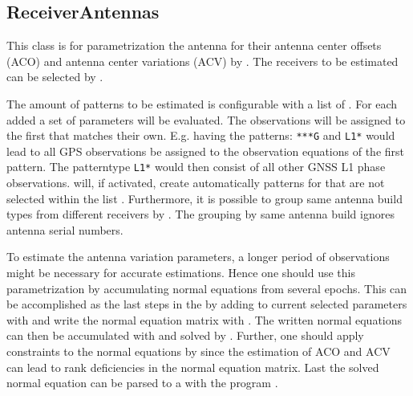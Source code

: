 \subsection{ReceiverAntennas}\label{gnssParametrizationType:receiverAntennas}
This class is for parametrization the antenna for their antenna center offsets (ACO) and
antenna center variations (ACV) by .
The receivers to be estimated can be selected by .

The amount of patterns to be estimated is configurable with a list of .
For each added  a set of parameters will be evaluated. The observations
will be assigned to the first  that matches their own.
E.g. having the patterns: \verb|***G| and \verb|L1*| would lead to all GPS observations be assigned
to the observation equations of the first pattern. The patterntype \verb|L1*| would then consist
of all other GNSS L1 phase observations.  will, if activated, create automatically patterns
for  that are not selected within the list .
Furthermore, it is possible to group same antenna build types from different receivers by .
The grouping by same antenna build ignores antenna serial numbers.

To estimate the antenna variation parameters, a longer period of observations might be necessary
for accurate estimations. Hence one should use this parametrization by
accumulating normal equations from several epochs.
This can be accomplished as the last steps in the 
 by adding 
to current selected parameters with 
and write the normal equation matrix with .
The written normal equations can then be accumulated with  and solved by .
Further, one should apply constraints to the normal equations by  since the estimation
 of ACO and ACV can lead to rank deficiencies in the normal equation matrix.
Last the solved normal equation can be parsed to a 
 with the program .

